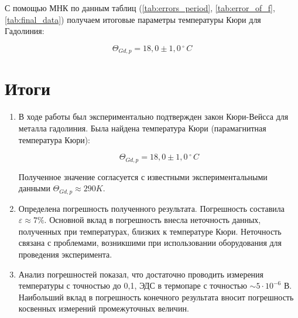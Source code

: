 \documentclass[10pt,a4paper]{article}
\begin{document}
	С помощью МНК по данным таблиц (\ref{tab:errors_period}, \ref{tab:error_of_f}, \ref{tab:final_data}) получаем итоговые параметры температуры Кюри для Гадолиния:
	
	\begin{equation}
		\Theta_{Gd, p} = 18,0 \pm 1,0\, ^{\circ}\,C
	\end{equation}	
	
	\newpage
	 
					 
	\section{Итоги}
	
	\begin{enumerate}
		\item В ходе работы был экспериментально подтвержден закон Кюри-Вейсса для металла гадолиния. Была найдена температура Кюри (парамагнитная температура Кюри):
		
			$$\Theta_{Gd, p} = 18,0 \pm 1,0 \, ^{\circ}\,C$$
			
			Полученное значение согласуется с известными экспериментальными данными $\Theta_{Gd, p} \approx 290 K$.
		\item Определена погрешность полученного результата. Погрешность составила $\varepsilon \approx 7 \%$. Основной вклад в погрешность внесла неточность данных, полученных при температурах, близких к температуре Кюри. Неточность связана с проблемами, возникшими при использовании оборудования для проведения эксперимента.
		
		\item Анализ погрешностей показал, что достаточно проводить измерения температуры с точностью до 0,1, ЭДС в термопаре с точностью $\sim 5 \cdot 10^{-6}$ В. Наибольший вклад в погрешность конечного результата вносит погрешность косвенных измерений промежуточных величин.
	\end{enumerate}
\end{document}
